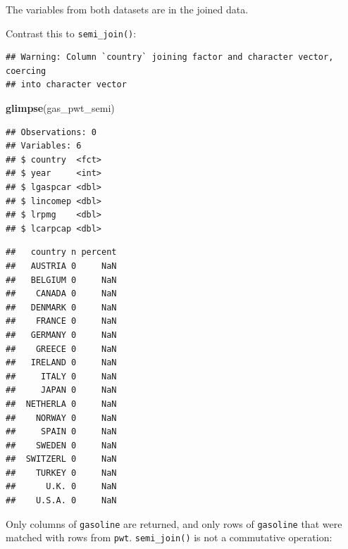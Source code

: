 \documentclass[]{gitbook}
\newenvironment{Shaded}{\begin{snugshade}}{\end{snugshade}}
\newcommand{\DataTypeTok}[1]{\textcolor[rgb]{0.13,0.29,0.53}{#1}}
\newcommand{\KeywordTok}[1]{\textcolor[rgb]{0.13,0.29,0.53}{\textbf{#1}}}
\newcommand{\NormalTok}[1]{#1}
\newcommand{\OperatorTok}[1]{\textcolor[rgb]{0.81,0.36,0.00}{\textbf{#1}}}
\newcommand{\StringTok}[1]{\textcolor[rgb]{0.31,0.60,0.02}{#1}}
\theoremstyle{definition}
\theoremstyle{definition}
\theoremstyle{definition}
\theoremstyle{remark}
\begin{document}
The variables from both datasets are in the joined data.

Contrast this to \texttt{semi\_join()}:

\begin{Shaded}
\end{Shaded}

\begin{verbatim}
## Warning: Column `country` joining factor and character vector, coercing
## into character vector
\end{verbatim}

\begin{Shaded}
\begin{Highlighting}[]
\KeywordTok{glimpse}\NormalTok{(gas_pwt_semi)}
\end{Highlighting}
\end{Shaded}

\begin{verbatim}
## Observations: 0
## Variables: 6
## $ country  <fct> 
## $ year     <int> 
## $ lgaspcar <dbl> 
## $ lincomep <dbl> 
## $ lrpmg    <dbl> 
## $ lcarpcap <dbl>
\end{verbatim}

\begin{Shaded}
\end{Shaded}

\begin{verbatim}
##   country n percent
##   AUSTRIA 0     NaN
##   BELGIUM 0     NaN
##    CANADA 0     NaN
##   DENMARK 0     NaN
##    FRANCE 0     NaN
##   GERMANY 0     NaN
##    GREECE 0     NaN
##   IRELAND 0     NaN
##     ITALY 0     NaN
##     JAPAN 0     NaN
##  NETHERLA 0     NaN
##    NORWAY 0     NaN
##     SPAIN 0     NaN
##    SWEDEN 0     NaN
##  SWITZERL 0     NaN
##    TURKEY 0     NaN
##      U.K. 0     NaN
##    U.S.A. 0     NaN
\end{verbatim}

Only columns of \texttt{gasoline} are returned, and only rows of
\texttt{gasoline} that were matched with rows from \texttt{pwt}.
\texttt{semi\_join()} is not a commutative operation:
\end{document}
